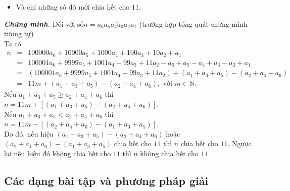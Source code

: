 \begin{enumerate}
\begin{itemize}
  \item Và chỉ những số đó mới chia hết cho $11$.
 \end{itemize}
 {\textit{\textbf{Chứng minh.}}} Đối với số$n=\overline{a_6a_5a_4a_3a_2a_1}$ (trường hợp tổng quát chứng minh tương tự).\\
 Ta có
 \allowdisplaybreaks
 \begin{eqnarray*}
  n &=& 100000a_6 + 10000a_5 + 1000a_4 + 100a_3 + 10a_2 + a_1\\
  &=& 100001a_6 + 9999a_5 + 1001a_4 + 99a_3 + 11a_2 - a_6+a_5-a_4+a_3-a_2+a_1\\
  &=& (100001a_6 + 9999a_5 + 1001a_4 + 99a_3 + 11a_2) + (a_1+a_3+a_5)-(a_2+a_4+a_6)\\
  &=& 11m + (a_1+a_3+a_5) - (a_2+a_4+a_6), \text{ với } m \in \mathbb{N}.
 \end{eqnarray*}
 Nếu $a_1+a_3+a_5 \geq a_2+a_4+a_6$ thì $n=11m+[(a_1+a_3+a_5)-(a_2+a_4+a_6)]$.\\
 Nếu $a_1+a_3+a_5 < a_2+a_4+a_6$ thì $n=11m-[(a_2+a_4+a_6)-(a_1+a_3+a_5)]$.\\
 Do đó, nếu hiệu $(a_1+a_3+a_5)-(a_2+a_4+a_6)$ hoặc $(a_2+a_4+a_6)-(a_1+a_3+a_5)$ chia hết cho $11$ thì $n$ chia hết cho $11$. Ngược lại nếu hiệu đó không chia hết cho $11$ thì $n$ không chia hết cho $11$.
\end{enumerate}

\subsection{Các dạng bài tập và phương pháp giải}

